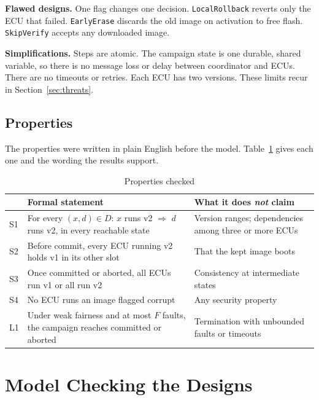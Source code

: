 \documentclass[journal]{IEEEtran}
\begin{document}
\textbf{Flawed designs.} One flag changes one decision. \texttt{LocalRollback} reverts only the ECU that failed. \texttt{EarlyErase} discards the old image on activation to free flash. \texttt{SkipVerify} accepts any downloaded image.

\textbf{Simplifications.} Steps are atomic. The campaign state is one durable, shared variable, so there is no message loss or delay between coordinator and ECUs. There are no timeouts or retries. Each ECU has two versions. These limits recur in Section~\ref{sec:threats}.

\subsection{Properties}
The properties were written in plain English before the model. Table~\ref{tab:props} gives each one and the wording the results support.

\begin{table}[t]
\caption{Properties checked}
\label{tab:props}
\centering
\footnotesize
\begin{tabular}{@{}p{0.5cm}p{3.6cm}p{3.6cm}@{}}
\toprule
& Formal statement & What it does \emph{not} claim \\
\midrule
S1 & For every $(x,d)\in D$: $x$ runs v2 $\Rightarrow$ $d$ runs v2, in every reachable state & Version ranges; dependencies among three or more ECUs \\
S2 & Before commit, every ECU running v2 holds v1 in its other slot & That the kept image boots \\
S3 & Once committed or aborted, all ECUs run v1 or all run v2 & Consistency at intermediate states \\
S4 & No ECU runs an image flagged corrupt & Any security property \\
L1 & Under weak fairness and at most $F$ faults, the campaign reaches committed or aborted & Termination with unbounded faults or timeouts \\
\bottomrule
\end{tabular}
\end{table}

\section{Model Checking the Designs}
\label{sec:flaws}
\end{document}
